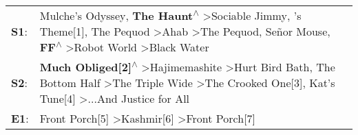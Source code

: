 \begin{supertabular}{p{0.03\textwidth}p{0.92\textwidth}}
 \textbf{S1}:  &  Mulche's Odyssey\textsuperscript{}, \enspace \textbf{The Haunt\textsuperscript{$\wedge$}} \textgreater \enspace Sociable Jimmy\textsuperscript{}, 's Theme[1]\textsuperscript{}, \enspace The Pequod\textsuperscript{} \textgreater \enspace Ahab\textsuperscript{} \textgreater \enspace The Pequod\textsuperscript{}, \enspace Señor Mouse\textsuperscript{}, \enspace \textbf{FF\textsuperscript{$\wedge$}} \textgreater \enspace Robot World\textsuperscript{} \textgreater \enspace Black Water\textsuperscript{}  \enspace  \\
 \textbf{S2}:  &                                                                                            \textbf{Much Obliged[2]\textsuperscript{$\wedge$}} \textgreater \enspace Hajimemashite\textsuperscript{} \textgreater \enspace Hurt Bird Bath\textsuperscript{}, \enspace The Bottom Half\textsuperscript{} \textgreater \enspace The Triple Wide\textsuperscript{} \textgreater \enspace The Crooked One[3]\textsuperscript{}, \enspace Kat's Tune[4]\textsuperscript{} \textgreater \enspace ...And Justice for All\textsuperscript{}  \enspace  \\
 \textbf{E1}:  &                                                                                                                                                                                                                                                                                                                                                                                         Front Porch[5]\textsuperscript{} \textgreater \enspace Kashmir[6]\textsuperscript{} \textgreater \enspace Front Porch[7]\textsuperscript{}  \enspace  \\
\end{supertabular}
